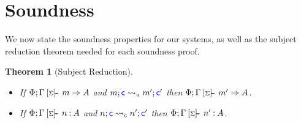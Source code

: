 \documentclass[msc,deptreport,cs]{infthesis} %
\newtheorem{theorem}{Theorem}
\newcommand{\counter}{{\color{blue} \textsf{c}}}
\newcommand{\sigentails}[1]{\mathbin{[{\text{\scriptsize ${#1}$}}]\hspace{-0.4ex}\text{-\!-}}\,}
\newcommand{\inferbase}[5]{#1; #3 \mathbin{#2} {#4} \Rightarrow {#5}}
\newcommand{\checkbase}[5]{#1; #3 \mathbin{#2} #5 \mathbin{:} #4}
\newcommand{\makes}[5]{\inferbase{#1}{\sigentails{#3}}{#2}{#4}{#5}}
\newcommand{\has}[5]{\checkbase{#1}{\sigentails{#3}}{#2}{#4}{#5}}
\newcommand{\inferskgs}{\makes{\kenv}{\Gamma}{\sigs}}
\newcommand{\checkskgs}{\has{\kenv}{\Gamma}{\sigs}}
\newcommand{\sigs}{\Sigma}
\newcommand{\redtou}{\leadsto_{\mathrm{u}}}
\newcommand{\redtoc}{\leadsto_{\mathrm{c}}}
\newcommand{\kenv}{\Phi}  %
\begin{document}
\section{Soundness}


We now state the soundness properties for our systems, as well as the subject
reduction theorem needed for each soundness proof.


\begin{theorem}[Subject Reduction]~
  \label{thm:sub-red}
\begin{itemize}
\item If $\inferskgs{m}{A}$ and $m; \counter \redtou m'; \counter'$ then $\inferskgs{m'}{A}$.
\item If $\checkskgs{A}{n}$ and $n; \counter \redtoc n'; \counter'$ then $\checkskgs{A}{n'}$.
\end{itemize}
  \end{theorem}
\end{document}
